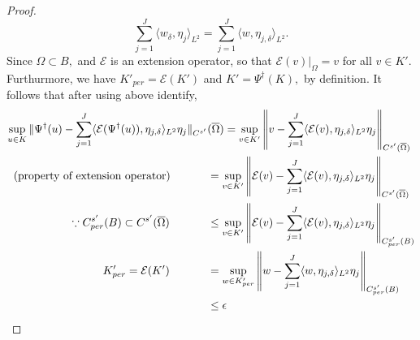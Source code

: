 \documentclass[reqno]{amsart}
\theoremstyle{plain}
\theoremstyle{definition}
\newcommand{\cal}[1]{\mathcal{#1}}
\begin{document}
\begin{proof}
    $$ \sum\limits_{j=1}^{J}\langle w_\delta,\eta_j\rangle_{L^2} = \sum\limits_{j=1}^{J}\langle w,\eta_{j,\delta}\rangle_{L^2}.$$
    Since $\Omega \subset B,$ and $\cal E$ is an extension operator, so that $\cal E(v)|_{\Omega} = v$ for all $v \in K'$. Furthurmore, we have $K'_{per} = \cal E(K')$ and $K' = \Psi^\dag(K),$ by definition. It follows that after using above identify,
    $$
    \begin{aligned}
    \sup\limits_{u \in K} \|\Psi^\dag(u) - \sum_{j=1}^{J} \langle \cal E (\Psi^\dag(u)),\eta_{j,\delta} \rangle_{L^2} \eta_j \|_{C^{s'}}&(\overline{\Omega}) = \sup\limits_{v \in K'} \left\|v - \sum_{j=1}^{J} \langle \cal E (v),\eta_{j,\delta} \rangle_{L^2} \eta_j \right\|_{C^{s'}(\overline{\Omega})} \\
    \text{ (property of extension operator) } \hspace{3em}&= \sup\limits_{v \in K'} \left\|\cal E(v) - \sum_{j=1}^{J} \langle \cal E (v),\eta_{j,\delta} \rangle_{L^2} \eta_j \right\|_{C^{s'}(\overline{\Omega})} \\
    \because C^{s'}_{per}(B) \subset C^{s'}(\overline{\Omega}) \hspace{3.4em} &\leq \sup\limits_{v \in K'} \left\|\cal E(v) - \sum_{j=1}^{J} \langle \cal E (v),\eta_{j,\delta} \rangle_{L^2} \eta_j \right\|_{C^{s'}_{per}(B)} \\
    K'_{per} = \cal E (K') \hspace{3.4em}&= \sup\limits_{w \in K'_{per}} \left\|w - \sum_{j=1}^{J} \langle w,\eta_{j,\delta} \rangle_{L^2} \eta_j \right\|_{C^{s'}_{per}(B)} \\ &\leq \epsilon
    \end{aligned}
    $$

\end{proof}
\end{document}
